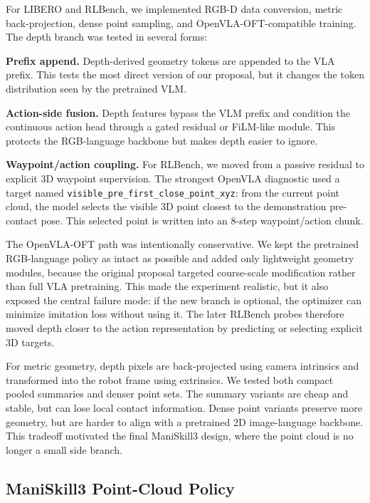 \documentclass[conference]{IEEEtran}
\begin{document}
For LIBERO and RLBench, we implemented RGB-D data conversion, metric back-projection, dense point sampling, and OpenVLA-OFT-compatible training. The depth branch was tested in several forms:

\textbf{Prefix append.}
Depth-derived geometry tokens are appended to the VLA prefix. This tests the most direct version of our proposal, but it changes the token distribution seen by the pretrained VLM.

\textbf{Action-side fusion.}
Depth features bypass the VLM prefix and condition the continuous action head through a gated residual or FiLM-like module. This protects the RGB-language backbone but makes depth easier to ignore.

\textbf{Waypoint/action coupling.}
For RLBench, we moved from a passive residual to explicit 3D waypoint supervision. The strongest OpenVLA diagnostic used a target named \texttt{visible\_pre\_first\_close\_point\_xyz}: from the current point cloud, the model selects the visible 3D point closest to the demonstration pre-contact pose. This selected point is written into an 8-step waypoint/action chunk.

The OpenVLA-OFT path was intentionally conservative. We kept the pretrained RGB-language policy as intact as possible and added only lightweight geometry modules, because the original proposal targeted course-scale modification rather than full VLA pretraining. This made the experiment realistic, but it also exposed the central failure mode: if the new branch is optional, the optimizer can minimize imitation loss without using it. The later RLBench probes therefore moved depth closer to the action representation by predicting or selecting explicit 3D targets.

For metric geometry, depth pixels are back-projected using camera intrinsics and transformed into the robot frame using extrinsics. We tested both compact pooled summaries and denser point sets. The summary variants are cheap and stable, but can lose local contact information. Dense point variants preserve more geometry, but are harder to align with a pretrained 2D image-language backbone. This tradeoff motivated the final ManiSkill3 design, where the point cloud is no longer a small side branch.

\subsection{ManiSkill3 Point-Cloud Policy}
\end{document}

